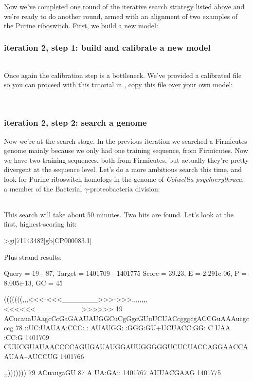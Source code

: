 
Now we've completed one round of the iterative search strategy listed
above and we're ready to do another round, armed with an alignment of
two examples of the Purine riboswitch. First, we build a new model:

\subsubsection{iteration 2, step 1: build and calibrate a new model}
\\

Once again the calibration step is a bottleneck. We've provided a
calibrated file so you can proceed with this tutorial in
, copy this file over your own model:

\\

\subsubsection{iteration 2, step 2: search a genome}

Now we're at the search stage. In the previous iteration we searched a
Firmicutes genome mainly because we only had one training sequence, from
Firmicutes. Now we have two training sequences, both from Firmicutes,
but actually they're pretty divergent at the sequence level. Let's do a
more ambitious search this time, and look for Purine riboswitch
homologs in the genome of \emph{Colwellia psychrerythraea}, a member of the
Bacterial $\gamma$-proteobacteria division:

\\

This search will take about 50 minutes. Two hits are found. Let's look
at the first, highest-scoring hit:

{\samepage
\begin{sreoutput}
>gi|71143482|gb|CP000083.1|

  Plus strand results:

 Query = 19 - 87, Target = 1401709 - 1401775
 Score = 39.23, E = 2.291e-06, P = 8.005e-13, GC =  45

           (((((((,,,<<<-<<<_______>>>->>>,,,,,,,,<<<<<<_________>>>>>>
        19 ACucauaUAagcCcGaGAAUAUGGCuCgGgcGUuUCUACcgggcgACCGuAAAucgcccg 78      
           ::UC:UAUAA:CCC: : AUAUGG: :GGG:GU+UCUACC:GG:  C  UAA   :CC:G
   1401709 CUUCGUAUAACCCCAGUGAUAUGGAUUGGGGGUCUCUACCAGGAACCAAUAA--AUCCUG 1401766 

           ,,)))))))
        79 ACuaugaGU 87      
           A UA:GA::
   1401767 AUUACGAAG 1401775 
\end{sreoutput}
}


